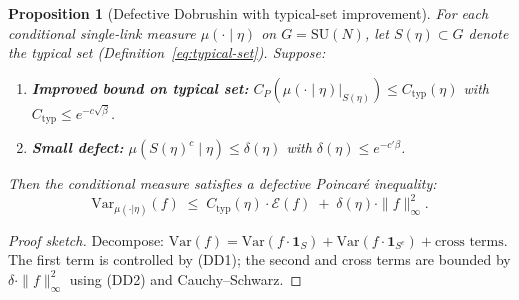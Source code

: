 \documentclass[12pt,a4paper]{article}
\theoremstyle{definition}
\theoremstyle{plain}
\newtheorem{proposition}[definition]{Proposition}
\theoremstyle{remark}
\begin{document}
\begin{proposition}[Defective Dobrushin with typical-set improvement]\label{prop:defective-dobrushin}
For each conditional single-link measure $\mu(\cdot \mid \eta)$ on $G = \mathrm{SU}(N)$, let $S(\eta) \subset G$ denote the typical set (Definition~\ref{eq:typical-set}). Suppose:
\begin{enumerate}
\item[\textup{(DD1)}] \textbf{Improved bound on typical set:} $C_P(\mu(\cdot \mid \eta)|_{S(\eta)}) \leq C_{\mathrm{typ}}(\eta)$ with $C_{\mathrm{typ}} \leq e^{-c\sqrt{\beta}}$.
\item[\textup{(DD2)}] \textbf{Small defect:} $\mu(S(\eta)^c \mid \eta) \leq \delta(\eta)$ with $\delta(\eta) \leq e^{-c'\beta}$.
\end{enumerate}
Then the conditional measure satisfies a \emph{defective Poincar\'e inequality}:
\begin{equation}\label{eq:defective-poincare}
  \mathrm{Var}_{\mu(\cdot|\eta)}(f) \;\leq\; C_{\mathrm{typ}}(\eta) \cdot \mathcal{E}(f) \;+\; \delta(\eta) \cdot \|f\|_\infty^2.
\end{equation}
\end{proposition}

\begin{proof}[Proof sketch]
Decompose: $\mathrm{Var}(f) = \mathrm{Var}(f \cdot \mathbf{1}_S) + \mathrm{Var}(f \cdot \mathbf{1}_{S^c}) + \text{cross terms}$. The first term is controlled by (DD1); the second and cross terms are bounded by $\delta \cdot \|f\|_\infty^2$ using (DD2) and Cauchy--Schwarz.
\end{proof}
\end{document}
